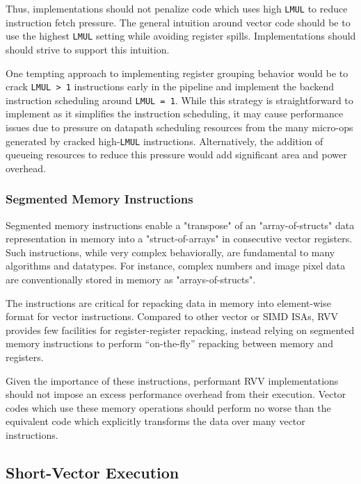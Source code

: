 Thus, implementations should not penalize code which uses high \texttt{LMUL} to reduce instruction fetch pressure.
The general intuition around vector code should be to use the highest \texttt{LMUL} setting while avoiding register spills.
Implementations should should strive to support this intuition.

One tempting approach to implementing register grouping behavior would be to crack \texttt{LMUL > 1} instructions early in the pipeline and implement the backend instruction scheduling around \texttt{LMUL = 1}.
While this strategy is straightforward to implement as it simplifies the instruction scheduling, it may cause performance issues due to pressure on datapath scheduling resources from the many micro-ops generated by cracked high-\texttt{LMUL} instructions.
Alternatively, the addition of queueing resources to reduce this pressure would add significant area and power overhead.


\subsubsection{Segmented Memory Instructions}

Segmented memory instructions enable a "transpose" of an "array-of-structs" data representation in memory into a "struct-of-arrays" in consecutive vector registers.
Such instructions, while very complex behaviorally, are fundamental to many algorithms and datatypes.
For instance, complex numbers and image pixel data are conventionally stored in memory as "arrays-of-structs".

The instructions are critical for repacking data in memory into element-wise format for vector instructions.
Compared to other vector or SIMD ISAs, RVV provides few facilities for register-register repacking, instead relying on segmented memory instructions to perform ``on-the-fly'' repacking between memory and registers.

Given the importance of these instructions, performant RVV implementations should not impose an excess performance overhead from their execution.
Vector codes which use these memory operations should perform no worse than the equivalent code which explicitly transforms the data over many vector instructions.

\newpage
\subsection{Short-Vector Execution}

